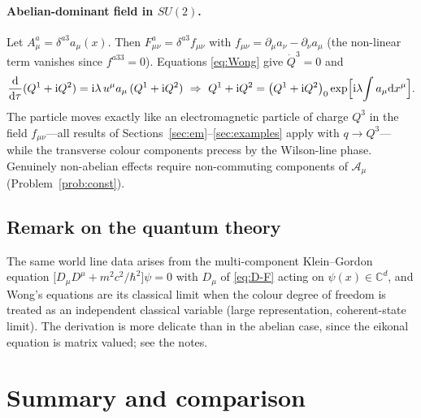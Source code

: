 \documentclass[11pt,a4paper]{book}
\numberwithin{equation}{section}
\newcommand{\dd}{\mathrm{d}}
\newcommand{\ii}{\mathrm{i}}
\theoremstyle{definition}
\theoremstyle{remark}
\begin{document}
\paragraph{Abelian-dominant field in $SU(2)$.}  Let $A^a_\mu=\delta^{a3}a_\mu(x)$.
Then $F^a_{\mu\nu}=\delta^{a3}f_{\mu\nu}$ with $f_{\mu\nu}=\partial_\mu a_\nu-\partial_\nu a_\mu$
(the non-linear term vanishes since $f^{a33}=0$).  Equations \eqref{eq:Wong} give
$\dot Q^3=0$ and
\begin{equation}
  \frac{\dd}{\dd\tau}(Q^1+\ii Q^2)=\ii\lambda\,u^\mu a_\mu\,(Q^1+\ii Q^2)
  \ \Rightarrow\ 
  Q^1+\ii Q^2=\bigl(Q^1+\ii Q^2\bigr)_0\exp\Bigl[\ii\lambda\!\int a_\mu\dd x^\mu\Bigr].
\end{equation}
The particle moves exactly like an electromagnetic particle of charge
$Q^3$ in the field $f_{\mu\nu}$---all results of Sections~\ref{sec:em}--\ref{sec:examples}
apply with $q\to Q^3$---while the transverse colour components precess by
the Wilson-line phase.  Genuinely non-abelian effects require non-commuting
components of $\mathcal A_\mu$ (Problem~\ref{prob:const}).

\subsection{Remark on the quantum theory}

The same world line data arises from the multi-component Klein--Gordon equation
$\bigl[D_\mu D^\mu+m^2c^2/\hbar^2\bigr]\psi=0$ with $D_\mu$ of
\eqref{eq:D-F} acting on $\psi(x)\in\mathbb C^d$, and Wong's equations are
its classical limit when the colour degree of freedom is treated as an
independent classical variable (large representation, coherent-state
limit).  The derivation is more delicate than in the abelian case, since the
eikonal equation is matrix valued; see the notes.

\section{Summary and comparison}\label{sec:summary}
\end{document}
